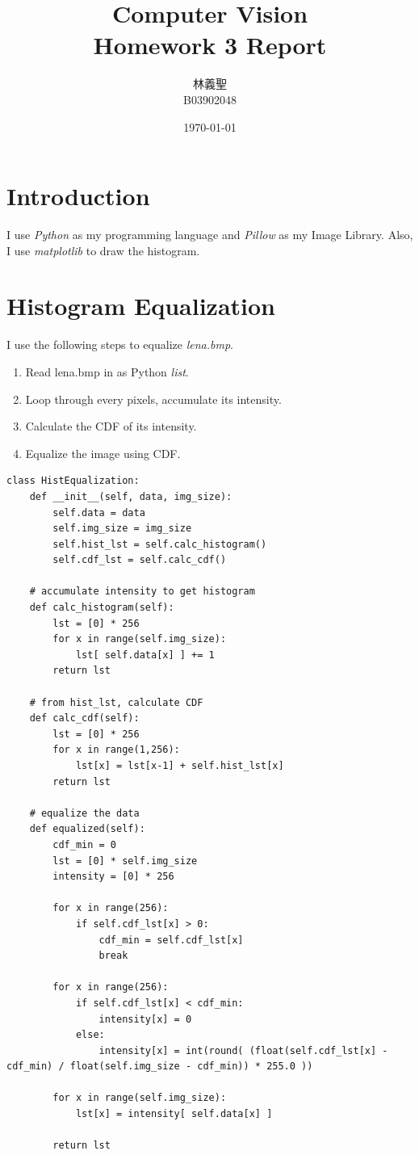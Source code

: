 \documentclass[12pt,twoside,a4paper]{article}
\title{Computer Vision\\Homework 3 Report}
\author{林義聖\\B03902048}
\date{\today}
\begin{document}
\maketitle

\section{Introduction}

I use \textit{Python} as my programming language and \textit{Pillow} as my Image Library. Also, I use \textit{matplotlib} to draw the histogram.

\section{Histogram Equalization}
I use the following steps to equalize \textit{lena.bmp}.
\begin{enumerate}
	\item Read lena.bmp in as Python \textit{list}.
	\item Loop through every pixels, accumulate its intensity.
	\item Calculate the CDF of its intensity.
	\item Equalize the image using CDF.
\end{enumerate}

\begin{lstlisting}[caption=Equalize the image]
class HistEqualization:
    def __init__(self, data, img_size):
        self.data = data
        self.img_size = img_size
        self.hist_lst = self.calc_histogram()
        self.cdf_lst = self.calc_cdf()

    # accumulate intensity to get histogram
    def calc_histogram(self):
        lst = [0] * 256
        for x in range(self.img_size):
            lst[ self.data[x] ] += 1
        return lst

    # from hist_lst, calculate CDF
    def calc_cdf(self):
        lst = [0] * 256
        for x in range(1,256):
            lst[x] = lst[x-1] + self.hist_lst[x]
        return lst

    # equalize the data
    def equalized(self):
        cdf_min = 0
        lst = [0] * self.img_size
        intensity = [0] * 256

        for x in range(256):
            if self.cdf_lst[x] > 0:
                cdf_min = self.cdf_lst[x]
                break

        for x in range(256):
            if self.cdf_lst[x] < cdf_min:
                intensity[x] = 0
            else:
                intensity[x] = int(round( (float(self.cdf_lst[x] - cdf_min) / float(self.img_size - cdf_min)) * 255.0 ))

        for x in range(self.img_size):
            lst[x] = intensity[ self.data[x] ]

        return lst
\end{lstlisting}
\end{document}
